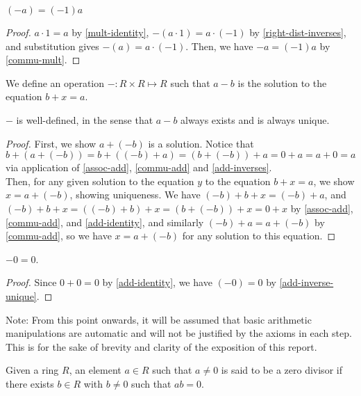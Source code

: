 \begin{theorem}\label{factor-neg-1}
$(-a) = (-1)a$
\end{theorem}
\begin{proof}
$a \cdot 1 = a$ by \ref{mult-identity}, $-(a \cdot 1) = a \cdot (-1)$ by \ref{right-dist-inverses}, and substitution gives $-(a) = a \cdot (-1)$. Then, we have $-a = (-1)a$ by \ref{commu-mult}.
\end{proof}

\begin{definition}[Subtraction]
We define an operation $-: R \times R \mapsto R$ such that $a-b$ is the solution to the equation $b+x = a$.
\end{definition}

\begin{theorem}\label{sub-well-def}
$-$ is well-defined, in the sense that $a-b$ always exists and is always unique. 
\end{theorem}
\begin{proof}
First, we show $a+(-b)$ is a solution. Notice that $b + (a+(-b)) = b + ((-b) + a) = (b + (-b)) + a = 0 + a = a + 0 = a$ via application of \ref{assoc-add}, \ref{commu-add} and \ref{add-inverses}. \\

Then, for any given solution to the equation $y$ to the equation $b+x = a$, we show $x = a+(-b)$, showing uniqueness. We have $(-b) + b+x = (-b) + a$, and $(-b) + b + x = ((-b)+b) + x = (b+(-b)) + x = 0 + x$ by \ref{assoc-add}, \ref{commu-add}, and \ref{add-identity}, and similarly $(-b) + a = a + (-b)$ by \ref{commu-add}, so we have $x = a + (-b)$ for any solution to this equation.
\end{proof}

\begin{lemma}[Inverse of $0$ is $0$]\label{0-inverse-0}
    $-0 = 0$.
\end{lemma}
\begin{proof}
    Since $0+0 = 0$ by \ref{add-identity}, we have $(-0) = 0$ by \ref{add-inverse-unique}.
\end{proof}

Note: From this point onwards, it will be assumed that basic arithmetic manipulations are automatic and will not be justified by the axioms in each step. This is for the sake of brevity and clarity of the exposition of this report.

\begin{definition}\label{zero-divisor}
    Given a ring $R$, an element $a \in R$ such that $a \neq 0$ is said to be a zero divisor if there exists $b \in R$ with $b \neq 0$ such that $ab = 0$.
\end{definition}

